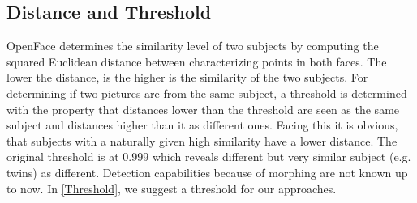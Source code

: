 \subsection{Distance and Threshold}
OpenFace determines the similarity level of two subjects by computing the squared Euclidean distance between characterizing points in both faces. The lower the distance, is the higher is the similarity of the two subjects. 
For determining if two pictures are from the same subject, a threshold is determined with the property that distances lower than the threshold are seen as the same subject and distances higher than it as different ones. 
Facing this it is obvious, that subjects with a naturally given high similarity have a lower distance. The original threshold is at 0.999 which reveals different but very similar subject (e.g. twins) as different. Detection capabilities because of morphing are not known up to now.
In \autoref{Threshold}, we suggest a threshold for our approaches. 

